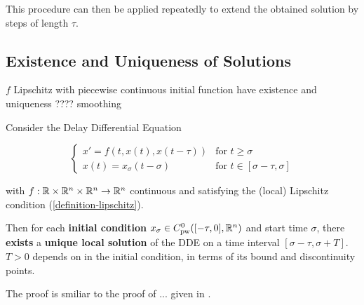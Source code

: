 This procedure can then be applied repeatedly to extend the obtained solution by steps of length $\tau$.

\subsection{Existence and Uniqueness of Solutions} \label{existence-and-uniqueness-of-solutions}

$f$ Lipschitz with piecewise continuous initial function have existence and uniqueness ???? smoothing

\begin{theorem}
    \label{theorem-solution-existence}
    Consider the Delay Differential Equation



    \begin{equation}
        \begin{cases}
            x' = f(t,x(t),x(t-\tau)) & \text{for } t\geq\sigma\\
            x(t) = x_\sigma(t-\sigma)     & \text{for } t\in [\sigma-\tau,\sigma]
        \end{cases}
    \end{equation}

    with $f:\mathbb{R}\times\mathbb{R}^n\times\mathbb{R}^n\rightarrow\mathbb{R}^n$ continuous and satisfying the (local) Lipschitz condition (\ref{definition-lipschitz}).

    Then for each \textbf{initial condition} $x_\sigma\in C^0_\text{pw}([-\tau,0],\mathbb{R}^n)$ and start time $\sigma$, there \textbf{exists} a \textbf{unique local solution} of the DDE on a time interval $[\sigma-\tau, \sigma+T]$. $T>0$ depends on in the initial condition, in terms of its bound and discontinuity points.
\end{theorem}
The proof is smiliar to the proof of ... given in \cite{smith2010introDDE}.
